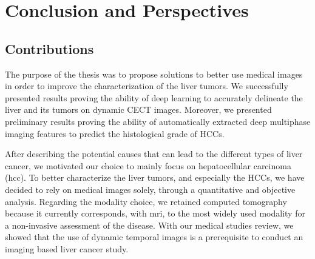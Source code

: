 \chapter*{Conclusion and Perspectives}
\label{cha:Conclusion}

\section*{Contributions}
\label{sec:ConclusionContributions}

The purpose of the thesis was to propose solutions to better use medical images in order to improve the characterization of the liver tumors. We successfully presented results proving the ability of deep learning to accurately delineate the liver and its tumors on dynamic CECT images. Moreover, we presented preliminary results proving the ability of automatically extracted deep multiphase imaging features to predict the histological grade of HCCs.

After describing the potential causes that can lead to the different
types of liver cancer, we motivated our choice to mainly focus on
hepatocellular carcinoma (\ac{hcc}).
To better characterize the liver tumors, and especially the HCCs, we have decided to rely on medical images solely, through a quantitative and objective analysis.
Regarding the modality choice, we retained computed tomography
because it currently corresponds, with \ac{mri}, to the most widely used modality  for a non-invasive assessment of the disease.
With our medical studies review, we showed that the use of dynamic temporal images is a prerequisite to conduct an imaging based liver cancer study.


